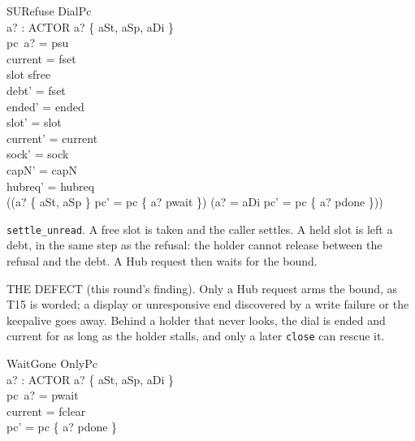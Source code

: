 \documentclass[a4paper,10pt,fleqn]{article}
\begin{document}
\begin{schema}{SURefuse}
  DialPc \\
  a? : ACTOR
\where
  a? \in \{ aSt, aSp, aDi \} \\
  pc~a? = psu \\
  current = fset \\
  slot \neq sfree \\
  debt' = fset \\
  ended' = ended \\
  slot' = slot \\
  current' = current \\
  sock' = sock \\
  capN' = capN \\
  hubreq' = hubreq \\
  ((a? \in \{ aSt, aSp \} \land pc' = pc \oplus \{ a? \mapsto pwait \}) \lor
    (a? = aDi \land pc' = pc \oplus \{ a? \mapsto pdone \}))
\end{schema}

\texttt{settle\_unread}.  A free slot is taken and the caller settles.  A held
slot is left a debt, in the same step as the refusal: the holder cannot release
between the refusal and the debt.  A Hub request then waits for the bound.

THE DEFECT (this round's finding).  Only a Hub request arms the bound, as T15 is
worded; a display or unresponsive end discovered by a write failure or the
keepalive goes away.  Behind a holder that never looks, the dial is ended and
current for as long as the holder stalls, and only a later \texttt{close} can
rescue it.

\begin{schema}{WaitGone}
  OnlyPc \\
  a? : ACTOR
\where
  a? \in \{ aSt, aSp, aDi \} \\
  pc~a? = pwait \\
  current = fclear \\
  pc' = pc \oplus \{ a? \mapsto pdone \}
\end{schema}
\end{document}
